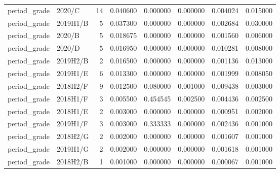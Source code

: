 \begin{tabular}{llrrrrrr}
period\_grade & 2020/C & 14 & 0.040600 & 0.000000 & 0.000000 & 0.004024 & 0.015000 \\
period\_grade & 2019H1/B & 5 & 0.037300 & 0.000000 & 0.000000 & 0.002684 & 0.030000 \\
period\_grade & 2020/B & 5 & 0.018675 & 0.000000 & 0.000000 & 0.001560 & 0.006000 \\
period\_grade & 2020/D & 5 & 0.016950 & 0.000000 & 0.000000 & 0.010281 & 0.008000 \\
period\_grade & 2019H2/B & 2 & 0.016500 & 0.000000 & 0.000000 & 0.001136 & 0.013000 \\
period\_grade & 2019H1/E & 6 & 0.013300 & 0.000000 & 0.000000 & 0.001999 & 0.008050 \\
period\_grade & 2018H2/F & 9 & 0.012500 & 0.080000 & 0.001000 & 0.009438 & 0.003000 \\
period\_grade & 2018H1/F & 3 & 0.005500 & 0.454545 & 0.002500 & 0.004436 & 0.002500 \\
period\_grade & 2018H1/E & 2 & 0.003000 & 0.000000 & 0.000000 & 0.000951 & 0.002000 \\
period\_grade & 2019H1/F & 3 & 0.003000 & 0.333333 & 0.000000 & 0.002436 & 0.001000 \\
period\_grade & 2018H2/G & 2 & 0.002000 & 0.000000 & 0.000000 & 0.001607 & 0.001000 \\
period\_grade & 2019H1/G & 2 & 0.002000 & 0.000000 & 0.000000 & 0.001618 & 0.001000 \\
period\_grade & 2018H2/B & 1 & 0.001000 & 0.000000 & 0.000000 & 0.000067 & 0.001000 \\
\bottomrule
\end{tabular}
